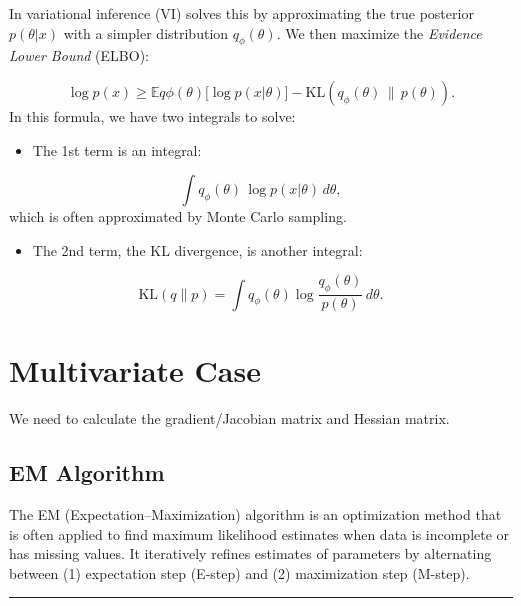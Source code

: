 \documentclass[
  letterpaper,
  DIV=11,
  numbers=noendperiod]{scrreprt}
\providecommand{\tightlist}{%
  \setlength{\itemsep}{0pt}\setlength{\parskip}{0pt}}
\begin{document}
In variational inference (VI) solves this by approximating the true
posterior \(p(\theta|x)\) with a simpler distribution
\(q_\phi(\theta)\). We then maximize the \emph{Evidence Lower Bound}
(ELBO):

\[
\log p(x) \geq \mathbb{E}{q\phi(\theta)}\big[\log p(x|\theta)\big] - \text{KL}(q_\phi(\theta)\,\|\,p(\theta)).
\] In this formula, we have two integrals to solve:

\begin{itemize}
\tightlist
\item
  The 1st term is an integral:
\end{itemize}

\[\int q_\phi(\theta)\,\log p(x|\theta)\, d\theta,\] which is often
approximated by Monte Carlo sampling.

\begin{itemize}
\tightlist
\item
  The 2nd term, the KL divergence, is another integral:
\end{itemize}

\[\text{KL}(q \| p) = \int q_\phi(\theta) \log \frac{q_\phi(\theta)}{p(\theta)} \, d\theta.\]

\section{}\label{section}

\section{Multivariate Case}\label{multivariate-case}

We need to calculate the gradient/Jacobian matrix and Hessian matrix.

\subsection{EM Algorithm}\label{em-algorithm}

The EM (Expectation--Maximization) algorithm is an optimization method
that is often applied to find maximum likelihood estimates when data is
incomplete or has missing values. It iteratively refines estimates of
parameters by alternating between (1) expectation step (E-step) and (2)
maximization step (M-step).

\begin{center}\rule{0.5\linewidth}{0.5pt}\end{center}
\end{document}
